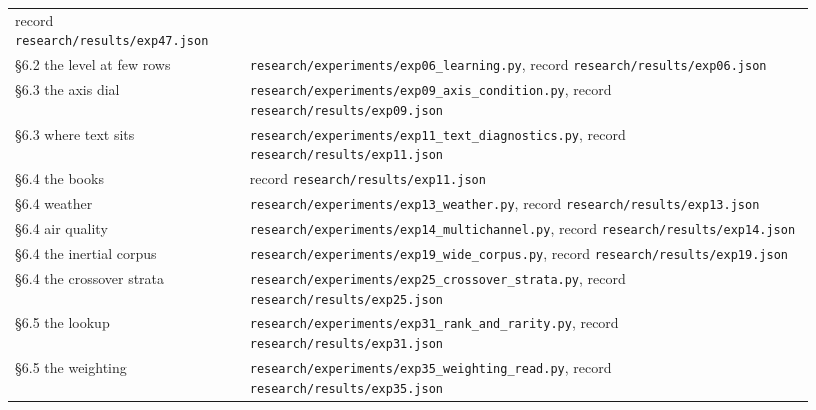 \documentclass[10pt,letterpaper,twocolumn]{article}
\begin{document}
\begin{center}
{\begin{xtabular}{L{0.276\linewidth}L{0.655\linewidth}}
record
\texttt{research/\allowbreak{}results/\allowbreak{}exp47.\allowbreak{}json} \\
§6.2 the level at few rows & \texttt{research/\allowbreak{}experiments/\allowbreak{}exp06\_\allowbreak{}learning.\allowbreak{}py},
record
\texttt{research/\allowbreak{}results/\allowbreak{}exp06.\allowbreak{}json} \\
§6.3 the axis dial & \texttt{research/\allowbreak{}experiments/\allowbreak{}exp09\_\allowbreak{}axis\_\allowbreak{}condition.\allowbreak{}py},
record
\texttt{research/\allowbreak{}results/\allowbreak{}exp09.\allowbreak{}json} \\
§6.3 where text sits & \texttt{research/\allowbreak{}experiments/\allowbreak{}exp11\_\allowbreak{}text\_\allowbreak{}diagnostics.\allowbreak{}py},
record
\texttt{research/\allowbreak{}results/\allowbreak{}exp11.\allowbreak{}json} \\
§6.4 the books & record
\texttt{research/\allowbreak{}results/\allowbreak{}exp11.\allowbreak{}json} \\
§6.4 weather & \texttt{research/\allowbreak{}experiments/\allowbreak{}exp13\_\allowbreak{}weather.\allowbreak{}py},
record
\texttt{research/\allowbreak{}results/\allowbreak{}exp13.\allowbreak{}json} \\
§6.4 air quality & \texttt{research/\allowbreak{}experiments/\allowbreak{}exp14\_\allowbreak{}multichannel.\allowbreak{}py},
record
\texttt{research/\allowbreak{}results/\allowbreak{}exp14.\allowbreak{}json} \\
§6.4 the inertial corpus & \texttt{research/\allowbreak{}experiments/\allowbreak{}exp19\_\allowbreak{}wide\_\allowbreak{}corpus.\allowbreak{}py},
record
\texttt{research/\allowbreak{}results/\allowbreak{}exp19.\allowbreak{}json} \\
§6.4 the crossover strata & \texttt{research/\allowbreak{}experiments/\allowbreak{}exp25\_\allowbreak{}crossover\_\allowbreak{}strata.\allowbreak{}py},
record
\texttt{research/\allowbreak{}results/\allowbreak{}exp25.\allowbreak{}json} \\
§6.5 the lookup & \texttt{research/\allowbreak{}experiments/\allowbreak{}exp31\_\allowbreak{}rank\_\allowbreak{}and\_\allowbreak{}rarity.\allowbreak{}py},
record
\texttt{research/\allowbreak{}results/\allowbreak{}exp31.\allowbreak{}json} \\
§6.5 the weighting & \texttt{research/\allowbreak{}experiments/\allowbreak{}exp35\_\allowbreak{}weighting\_\allowbreak{}read.\allowbreak{}py},
record
\texttt{research/\allowbreak{}results/\allowbreak{}exp35.\allowbreak{}json} \\

\end{xtabular}}
\end{center}
\end{document}
